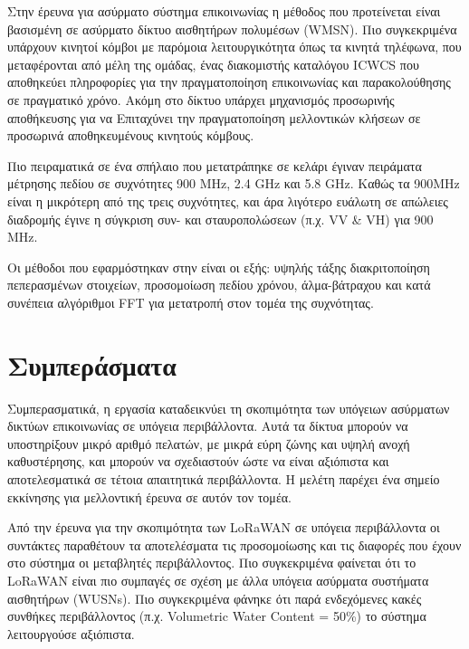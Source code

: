 \documentclass[12pt, greek]{article}
\begin{document}
\begin{multicols*}{2}
        Στην έρευνα για ασύρματο σύστημα επικοινωνίας \cite{yavuz_-cave_2009} η μέθοδος που
        προτείνεται είναι βασισμένη σε ασύρματο δίκτυο αισθητήρων πολυμέσων (WMSN). Πιο
        συγκεκριμένα υπάρχουν κινητοί κόμβοι με παρόμοια λειτουργικότητα όπως τα κινητά τηλέφωνα,
        που μεταφέρονται από μέλη της ομάδας, ένας διακομιστής καταλόγου ICWCS που αποθηκεύει
        πληροφορίες για την πραγματοποίηση επικοινωνίας και παρακολούθησης σε πραγματικό χρόνο. Ακόμη
        στο δίκτυο υπάρχει μηχανισμός προσωρινής αποθήκευσης για να Επιταχύνει την πραγματοποίηση
        μελλοντικών κλήσεων σε προσωρινά αποθηκευμένους κινητούς κόμβους.
        
        Πιο πειραματικά σε ένα σπήλαιο που μετατράπηκε σε κελάρι \cite{soo_propagation_2018}
        έγιναν πειράματα μέτρησης πεδίου σε συχνότητες 900 MHz, 2.4 GHz και 5.8 GHz. Καθώς
        τα 900MHz είναι η μικρότερη από της τρεις συχνότητες, και άρα λιγότερο ευάλωτη σε 
        απώλειες διαδρομής έγινε η σύγκριση συν- και σταυροπολώσεων (π.χ. VV \& VH) για 900 MHz.
        
        Οι μέθοδοι που εφαρμόστηκαν στην \cite{pingenot_full_2005} είναι οι εξής: υψηλής τάξης
        διακριτοποίηση πεπερασμένων στοιχείων, προσομοίωση πεδίου χρόνου, άλμα-βάτραχου και
        κατά συνέπεια αλγόριθμοι FFT για μετατροπή στον τομέα της συχνότητας.

    \section{\normalsize \textbf{Συμπεράσματα}}
        Συμπερασματικά, η εργασία καταδεικνύει τη σκοπιμότητα των
        υπόγειων ασύρματων δικτύων επικοινωνίας σε υπόγεια περιβάλλοντα. Αυτά τα δίκτυα
        μπορούν να υποστηρίξουν μικρό αριθμό πελατών, με μικρά εύρη ζώνης και υψηλή ανοχή
        καθυστέρησης, και μπορούν να σχεδιαστούν ώστε να είναι αξιόπιστα και αποτελεσματικά σε
        τέτοια απαιτητικά περιβάλλοντα. Η μελέτη παρέχει ένα σημείο εκκίνησης για μελλοντική
        έρευνα σε αυτόν τον τομέα.

        Από την έρευνα για την σκοπιμότητα των LoRaWAN σε υπόγεια περιβάλλοντα 
        \cite{zhao_feasibility_2023} οι συντάκτες παραθέτουν τα αποτελέσματα τις προσομοίωσης
        και τις διαφορές που έχουν στο σύστημα οι μεταβλητές περιβάλλοντος. Πιο συγκεκριμένα
        φαίνεται ότι το LoRaWAN είναι πιο συμπαγές σε σχέση με άλλα υπόγεια ασύρματα συστήματα
        αισθητήρων (WUSNs). Πιο συγκεκριμένα φάνηκε ότι παρά ενδεχόμενες κακές συνθήκες 
        περιβάλλοντος (π.χ. Volumetric Water Content = 50\%) το σύστημα λειτουργούσε αξιόπιστα.


\end{multicols*}
\end{document}
